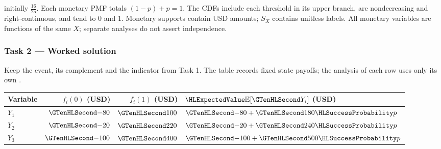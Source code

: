 initially $\frac{16}{25}$.
Each monetary PMF totals $(1-p)+p=1$. The CDFs include each threshold
in its upper branch, are nondecreasing and right-continuous, and tend to 0 and 1.
Monetary supports contain USD amounts; $S_X$ contains unitless labels.
All monetary variables are functions of the same $X$; separate analyses do not assert independence.
\clearpage\subsubsection*{Task 2 --- Worked solution}\label{sol:c3-restaurant-decision}
Keep the event, its complement and the indicator from Task 1.
The table records fixed state payoffs; the analysis of each row uses only its own .
\begin{center}\begin{tabular}{lrrl}\toprule
Variable & $f_i(0)$ (USD) & $f_i(1)$ (USD) & $\ExpectedValue{\mathbb E}[\Money{Y_i}]$ (USD)\\\midrule
$Y_1$ & $\Money{-80}$ & $\Money{100}$ & $\Money{-80}+\Money{180}\SuccessProb{p}$\\
$Y_2$ & $\Money{-20}$ & $\Money{220}$ & $\Money{-20}+\Money{240}\SuccessProb{p}$\\
$Y_3$ & $\Money{-100}$ & $\Money{400}$ & $\Money{-100}+\Money{500}\SuccessProb{p}$\\
\bottomrule\end{tabular}\end{center}
